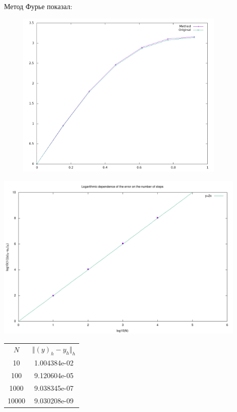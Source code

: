 \documentclass[12pt]{article}
\begin{document}
\begin{enumerate}[I.]
        Метод Фурье показал:
        \begin{center}
            \includegraphics[width=12cm, height=8cm]{fourier_yn.png}
            
            \includegraphics[width=12cm, height=8cm]{fourier_scale.png}
            
            \begin{tabular}{c c}
                $N$   & $\Vert(y)_h-y_h\Vert_h$ \\
                10    & 1.004384e-02 \\
                100   & 9.120604e-05 \\
                1000  & 9.038345e-07 \\
                10000 & 9.030208e-09 \\
            \end{tabular}
        \end{center}

        \newpage


\end{enumerate}
\end{document}
